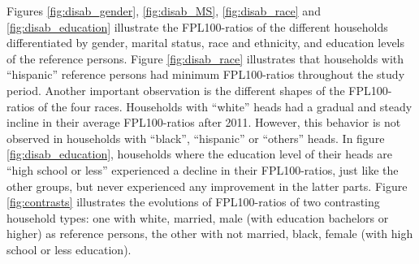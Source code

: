 \documentclass[11pt]{extarticle} %
\begin{document}
Figures \ref{fig:disab_gender}, \ref{fig:disab_MS}, \ref{fig:disab_race} and \ref{fig:disab_education} illustrate the FPL100-ratios of the different households differentiated by gender, marital status, race and ethnicity, and education levels of the reference persons. Figure \ref{fig:disab_race} illustrates that households with ``hispanic'' reference persons had minimum FPL100-ratios throughout the study period. Another important observation is the different shapes of the FPL100-ratios of the four races. Households with ``white'' heads had a gradual and steady incline in their average FPL100-ratios after 2011. However, this behavior is not observed in households with ``black'', ``hispanic'' or ``others'' heads. In figure \ref{fig:disab_education}, households where the education level of their heads are ``high school or less'' experienced a decline in their FPL100-ratios, just like the other groups, but never experienced any improvement in the latter parts. Figure \ref{fig:contrasts} illustrates the evolutions of FPL100-ratios of two contrasting household types: one with white, married, male (with education bachelors or higher) as reference persons, the other with not married, black, female (with high school or less education). 
\end{document}
